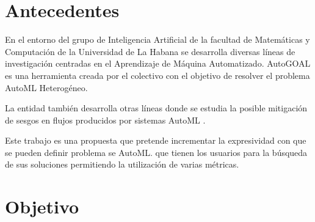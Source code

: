 

\section*{Antecedentes}

En el entorno del grupo de Inteligencia Artificial de la facultad de Matem\'aticas y Computaci\'on de la Universidad de La Habana se desarrolla diversas l\'ineas de investigaci\'on centradas en el Aprendizaje de M\'aquina Automatizado. AutoGOAL  es una herramienta creada por el colectivo con el objetivo de resolver el problema AutoML Heterog\'eneo.

La entidad tambi\'en desarrolla otras l\'ineas donde se estudia la posible mitigaci\'on de sesgos en flujos producidos por sistemas AutoML . 

Este trabajo es una propuesta que pretende incrementar la expresividad con que se pueden definir problema se AutoML. que tienen los usuarios para la b\'usqueda de sus soluciones permitiendo la utilizaci\'on de varias m\'etricas.


 
\section*{Objetivo}
